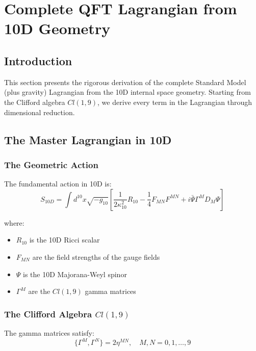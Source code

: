 \section{Complete QFT Lagrangian from 10D Geometry}
\label{sec:qft_lagrangian_complete}

\subsection{Introduction}

This section presents the rigorous derivation of the complete Standard Model (plus gravity) Lagrangian from the 10D internal space geometry. Starting from the Clifford algebra $Cl(1,9)$, we derive every term in the Lagrangian through dimensional reduction.

\subsection{The Master Lagrangian in 10D}

\subsubsection{The Geometric Action}

The fundamental action in 10D is:
\begin{equation}
    S_{10D} = \int d^{10}x \sqrt{-g_{10}} \left[ \frac{1}{2\kappa_{10}^2}R_{10} - \frac{1}{4}F_{MN}F^{MN} + i\bar{\Psi}\Gamma^M D_M \Psi \right]
\end{equation}

where:
\begin{itemize}
    \item $R_{10}$ is the 10D Ricci scalar
    \item $F_{MN}$ are the field strengths of the gauge fields
    \item $\Psi$ is the 10D Majorana-Weyl spinor
    \item $\Gamma^M$ are the $Cl(1,9)$ gamma matrices
\end{itemize}

\subsubsection{The Clifford Algebra $Cl(1,9)$}

The gamma matrices satisfy:
\begin{equation}
    \{\Gamma^M, \Gamma^N\} = 2\eta^{MN}, \quad M,N = 0,1,\ldots,9
\end{equation}

